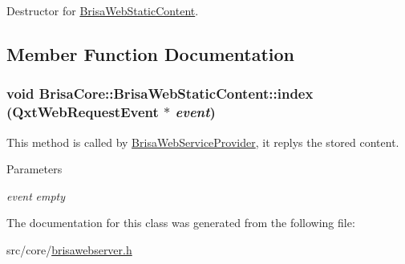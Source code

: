 Destructor for \hyperlink{classBrisaCore_1_1BrisaWebStaticContent}{BrisaWebStaticContent}. 

\subsection{Member Function Documentation}
\hypertarget{classBrisaCore_1_1BrisaWebStaticContent_ac66701b1cebdc7e4981de7d4b4034093}{
\subsubsection[{index}]{\setlength{\rightskip}{0pt plus 5cm}void BrisaCore::BrisaWebStaticContent::index (QxtWebRequestEvent $\ast$ {\em event})}}
\label{classBrisaCore_1_1BrisaWebStaticContent_ac66701b1cebdc7e4981de7d4b4034093}


This method is called by \hyperlink{classBrisaCore_1_1BrisaWebServiceProvider}{BrisaWebServiceProvider}, it replys the stored content. 
\begin{DoxyParams}{Parameters}
\item[{\em event}]{\itshape empty\/} \end{DoxyParams}


The documentation for this class was generated from the following file:\begin{DoxyCompactItemize}
\item 
src/core/\hyperlink{brisawebserver_8h}{brisawebserver.h}\end{DoxyCompactItemize}
